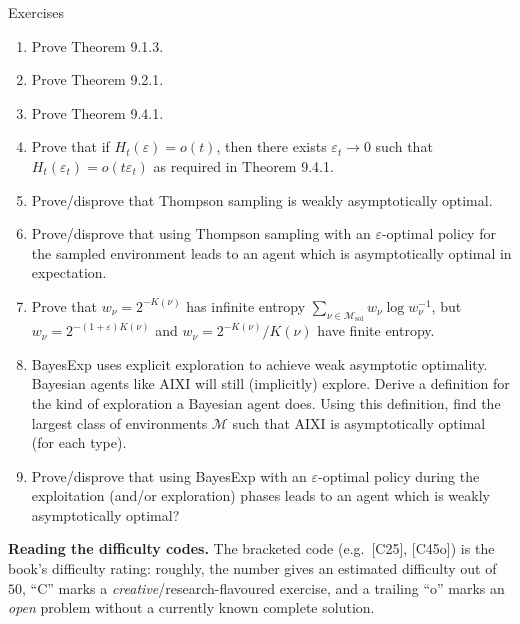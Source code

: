 \documentclass[aspectratio=169,10pt]{beamer}
\begin{document}
\begin{frame}[allowframebreaks]{Exercises}
  \begin{enumerate}
    \item[\textbf{1.}] [C25] Prove Theorem 9.1.3.
    \item[\textbf{2.}] [C32] Prove Theorem 9.2.1.
    \item[\textbf{3.}] [C28] Prove Theorem 9.4.1.
    \item[\textbf{4.}] [C20] Prove that if $H_t(\varepsilon)=o(t)$, then
      there exists $\varepsilon_t\to0$ such that $H_t(\varepsilon_t)=o(t\varepsilon_t)$
      as required in Theorem 9.4.1.
    \item[\textbf{5.}] [C45o] Prove/disprove that Thompson sampling is
      weakly asymptotically optimal.
    \item[\textbf{6.}] [C45o] Prove/disprove that using Thompson sampling
      with an $\varepsilon$-optimal policy for the sampled environment
      leads to an agent which is asymptotically optimal in expectation.
    \item[\textbf{7.}] [C20i] Prove that $w_\nu=2^{-K(\nu)}$ has infinite
      entropy $\sum_{\nu\in\mathcal{M}_{\mathrm{sol}}} w_\nu\log w_\nu^{-1}$,
      but $w_\nu=2^{-(1+\varepsilon)K(\nu)}$ and $w_\nu=2^{-K(\nu)}/K(\nu)$
      have finite entropy.
    \item[\textbf{8.}] [C38] BayesExp uses explicit exploration to achieve
      weak asymptotic optimality. Bayesian agents like AIXI will still
      (implicitly) explore. Derive a definition for the kind of
      exploration a Bayesian agent does. Using this definition, find the
      largest class of environments $\mathcal{M}$ such that AIXI is
      asymptotically optimal (for each type).
    \item[\textbf{9.}] [C45o] Prove/disprove that using BayesExp with an
      $\varepsilon$-optimal policy during the exploitation (and/or
      exploration) phases leads to an agent which is weakly asymptotically
      optimal?
  \end{enumerate}
  \textbf{Reading the difficulty codes.} The bracketed code (e.g.\
  [C25], [C45o]) is the book's difficulty rating: roughly, the number
  gives an estimated difficulty out of $50$, ``C'' marks a
  \emph{creative}/research-flavoured exercise, and a trailing ``o''
  marks an \emph{open} problem without a currently known complete
  solution.
\end{frame}

\end{document}

